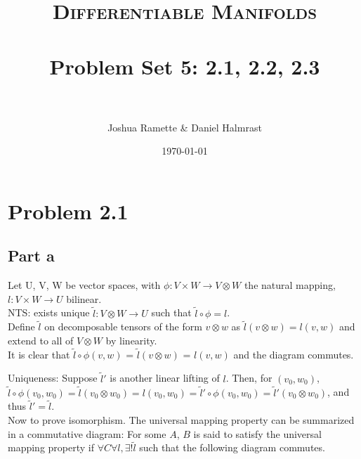 \documentclass[paper=a4, fontsize=11pt]{scrartcl} %
\title{
\normalfont \normalsize 
\textsc{Differentiable Manifolds} \\ [25pt] %
\horrule{0.5pt} \\[0.4cm] %
\huge Problem Set 5: 2.1, 2.2, 2.3 \\ %
\horrule{2pt} \\[0.5cm] %
}
\author{Joshua Ramette \& Daniel Halmrast} %
\date{\normalsize\today} %
\numberwithin{equation}{section} %
\numberwithin{figure}{section} %
\numberwithin{table}{section} %
\begin{document}
\maketitle %


\section*{Problem 2.1}
\subsection*{Part a}

Let U, V, W be vector spaces, with $\phi: V \times W \to V \otimes W$ the natural mapping, $ l: V \times W \to U$ bilinear. \\

NTS: exists unique $\widetilde{l}: V \otimes W \to U$ such that $\widetilde{l} \circ \phi = l$.\\

Define $\widetilde{l}$ on decomposable tensors of the form $v \otimes w$ as $\widetilde{l}(v \otimes w) = l(v,w)$ 
and extend to all of $V \otimes W$ by linearity. \\

It is clear that $\widetilde{l} \circ \phi(v, w) $ = $\widetilde{l} (v \otimes w) $ = $l(v,w)$ and the diagram commutes.

Uniqueness: Suppose $\widetilde{l}'$ is another linear lifting of $l$. 
Then, for $(v_0, w_0)$, 
$\widetilde{l} \circ \phi(v_0, w_0) = \widetilde{l}(v_0 \otimes w_0) = l(v_0,w_0) = \widetilde{l}' \circ \phi(v_0,w_0) = \widetilde{l}'(v_0 \otimes w_0)$,
and thus $\widetilde{l}' = \widetilde{l}$. \\

Now to prove isomorphism.
The universal mapping property can be summarized in a commutative diagram:
For some $A$, $B$ is said to satisfy the universal mapping property if $\forall C \forall l, \exists !\widetilde{l}$
such that the following diagram commutes.\\
\begin{center}
\end{center}
\end{document}
